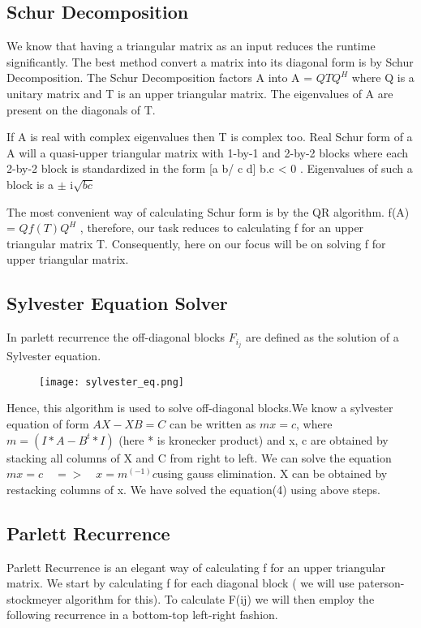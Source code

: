 \documentclass{article}
\begin{document}
\subsection{Schur Decomposition}

We know that having a triangular matrix as an input reduces the runtime significantly. The best method convert a matrix into its diagonal form is by Schur Decomposition. The Schur Decomposition factors A into A = $QTQ^H$ where Q is a unitary matrix and T is an upper triangular matrix. The eigenvalues of A are present on the diagonals of T. \par
If A is real with complex eigenvalues then T is complex too. Real Schur form of a A will a quasi-upper triangular matrix with 1-by-1 and 2-by-2 blocks where each 2-by-2 block is standardized in the form [a b/ c d] b.c < 0 . Eigenvalues of such a block is a $\pm$ i$\sqrt{bc}$ \par
The most convenient way of calculating Schur form is by the QR algorithm. f(A) = $Qf(T)Q^H$ , therefore, our task reduces to calculating f for an upper triangular matrix T. Consequently, here on our focus will be on solving f for upper triangular matrix.

\subsection{Sylvester Equation Solver}
In parlett recurrence the off-diagonal blocks $F_i_j$ are defined as the solution of a Sylvester equation.
\begin{figure}[H]
 \centering
 \texttt{[image: sylvester\_eq.png]}
\end{figure}
Hence, this algorithm is used to solve off-diagonal blocks.We know a sylvester equation of form $AX - XB = C$ can be written as $mx = c$, where $m = (I * A - B^t * I)$ (here * is kronecker product) and x, c are obtained by stacking all columns of X and C from right to left. We can solve the equation $mx = c\quad  =>\quad  x = m^(-1)c$\quad  using gauss elimination. X can be obtained by restacking columns of x. We have solved the equation(4) using above steps.


\subsection{Parlett Recurrence}
Parlett Recurrence is an elegant way of calculating f for an upper triangular matrix. We start by calculating f for each diagonal block ( we will use paterson-stockmeyer algorithm for this). To calculate F(ij) we will then employ the following recurrence in a bottom-top left-right fashion. 
\end{document}
